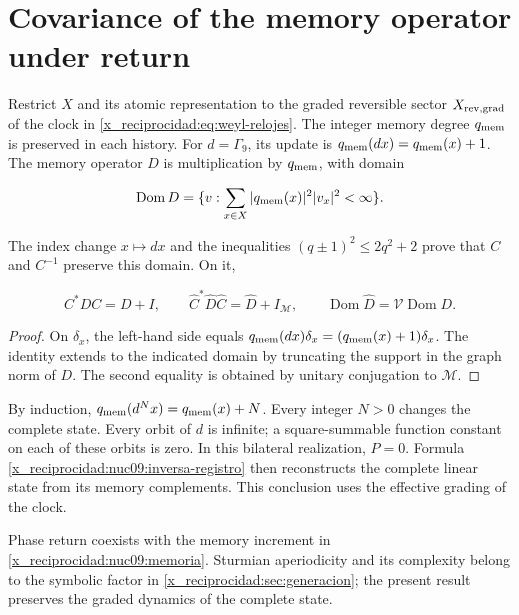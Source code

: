 \section{Covariance of the memory operator under return}

Restrict \(X\) and its atomic representation to the graded reversible sector \(X_{\rm rev,grad}\) of the clock in \eqref{x_reciprocidad:eq:weyl-relojes}. The integer memory degree \(q_{\rm mem}\) is preserved in each history. For \(d=\Gamma_9\), its update is \(q_{\rm mem}(dx)=q_{\rm mem}(x)+1\). The memory operator \(D\) is multiplication by \(q_{\rm mem}\), with domain



\[
\operatorname{Dom}D=\{v:\sum_{x\in X}|q_{\rm mem}(x)|^2|v_x|^2<\infty\}.
\]



The index change \(x\mapsto dx\) and the inequalities \((q\pm1)^2\le2q^2+2\) prove that \(C\) and \(C^{-1}\) preserve this domain. On it,



\begin{equation}
C^*DC=D+I,\qquad
\widehat C^*\widehat D\widehat C=\widehat D+I_{\mathcal M},
\qquad\operatorname{Dom}\widehat D=\mathcal V\operatorname{Dom}D.
\label{x_reciprocidad:nuc09:memoria}
\end{equation}



\begin{proof}
On \(\delta_x\), the left-hand side equals \(q_{\rm mem}(dx)\delta_x=(q_{\rm mem}(x)+1)\delta_x\). The identity extends to the indicated domain by truncating the support in the graph norm of \(D\). The second equality is obtained by unitary conjugation to \(\mathcal M\).
\end{proof}

By induction, \(q_{\rm mem}(d^Nx)=q_{\rm mem}(x)+N\). Every integer \(N>0\) changes the complete state. Every orbit of \(d\) is infinite; a square-summable function constant on each of these orbits is zero. In this bilateral realization, \(P=0\). Formula \eqref{x_reciprocidad:nuc09:inversa-registro} then reconstructs the complete linear state from its memory complements. This conclusion uses the effective grading of the clock.

Phase return coexists with the memory increment in \eqref{x_reciprocidad:nuc09:memoria}. Sturmian aperiodicity and its complexity belong to the symbolic factor in \cref{x_reciprocidad:sec:generacion}; the present result preserves the graded dynamics of the complete state.

